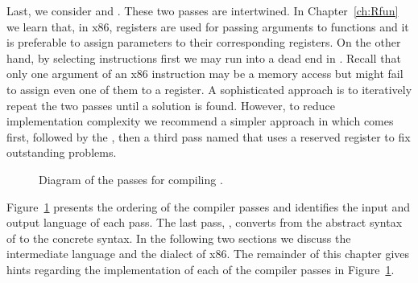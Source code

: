 \documentclass[11pt]{book}
\begin{document}
Last, we consider  and .
These two passes are intertwined. In Chapter~\ref{ch:Rfun} we
learn that, in x86, registers are used for passing arguments to
functions and it is preferable to assign parameters to their
corresponding registers. On the other hand, by selecting instructions
first we may run into a dead end in . Recall that
only one argument of an x86 instruction may be a memory access but
 might fail to assign even one of them to a
register.
%
A sophisticated approach is to iteratively repeat the two passes until
a solution is found. However, to reduce implementation complexity we
recommend a simpler approach in which  comes
first, followed by the , then a third pass named
 that uses a reserved register to fix
outstanding problems.

\begin{figure}[tbp]

\caption{Diagram of the passes for compiling \LangVar{}. }
\label{fig:Rvar-passes}
\end{figure}

Figure~\ref{fig:Rvar-passes} presents the ordering of the compiler
passes and identifies the input and output language of each pass.  The
last pass, , converts from the abstract syntax of
\LangXInt{} to the concrete syntax.  In the following two sections
we discuss the \LangCVar{} intermediate language and the \LangXVar{}
dialect of x86. The remainder of this chapter gives hints regarding
the implementation of each of the compiler passes in
Figure~\ref{fig:Rvar-passes}.
\end{document}
